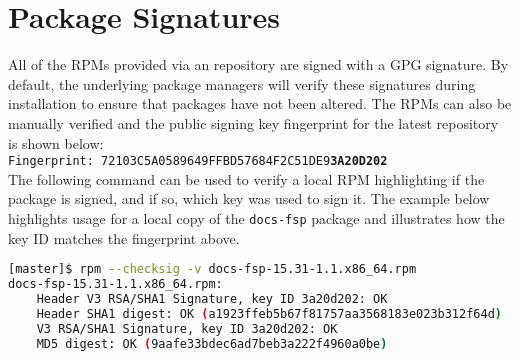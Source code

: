 \newpage
\section{Package Signatures}

All of the RPMs provided via an \FSP{} repository are signed with a GPG
signature. By default, the underlying package managers will verify these signatures during
installation to ensure that packages have not been altered. The RPMs can also
be manually verified and the public signing key fingerprint for the latest
repository is shown below: \\

\texttt{Fingerprint: 72103C5A0589649FFBD57684F2C51DE9{\bf3A20D202}} \\

\noindent The following command can be used to verify a local RPM highlighting if the package
is signed, and if so, which key was used to sign it.  The example below highlights
usage for a local copy of the \texttt{docs-fsp} package and illustrates how the
key ID matches the fingerprint above.

\begin{lstlisting}[language=bash,keywords={}]
[master]$ rpm --checksig -v docs-fsp-15.31-1.1.x86_64.rpm
docs-fsp-15.31-1.1.x86_64.rpm:
    Header V3 RSA/SHA1 Signature, key ID 3a20d202: OK
    Header SHA1 digest: OK (a1923ffeb5b67f81757aa3568183e023b312f64d)
    V3 RSA/SHA1 Signature, key ID 3a20d202: OK
    MD5 digest: OK (9aafe33bdec6ad7beb3a222f4960a0be)
\end{lstlisting}



